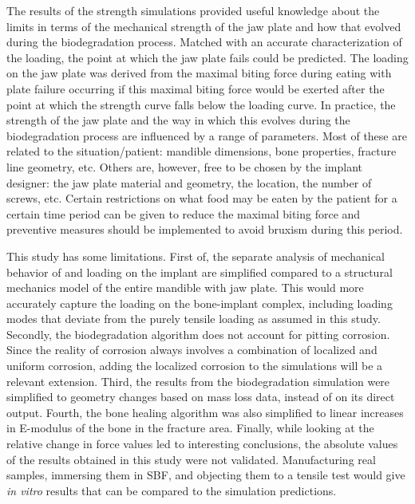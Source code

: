 The results of the strength simulations provided useful knowledge about the limits in terms of the mechanical strength of the jaw plate and how that evolved during the biodegradation process. Matched with an accurate characterization of the loading, the point at which the jaw plate fails could be predicted. The loading on the jaw plate was derived from the maximal biting force during eating with plate failure occurring if this maximal biting force would be exerted after the point at which the strength curve falls below the loading curve. In practice, the strength of the jaw plate and the way in which this evolves during the biodegradation process are influenced by a range of parameters. Most of these are related to the situation/patient: mandible dimensions, bone properties, fracture line geometry, etc. Others are, however, free to be chosen by the implant designer: the jaw plate material and geometry, the location, the number of screws, etc. Certain restrictions on what food may be eaten by the patient for a certain time period can be given to reduce the maximal biting force and preventive measures should be implemented to avoid bruxism during this period. 

This study has some limitations. First of, the separate analysis of mechanical behavior of and loading on the implant are simplified compared to a structural mechanics model of the entire mandible with jaw plate. This would more accurately capture the loading on the bone-implant complex, including loading modes that deviate from the purely tensile loading as assumed in this study. Secondly, the biodegradation algorithm does not account for pitting corrosion. Since the reality of corrosion always involves a combination of localized and uniform corrosion, adding the localized corrosion to the simulations will be a relevant extension. Third, the results from the biodegradation simulation were simplified to geometry changes based on mass loss data, instead of on its direct output. Fourth, the bone healing algorithm was also simplified to linear increases in E-modulus of the bone in the fracture area. Finally, while looking at the relative change in force values led to interesting conclusions, the absolute values of the results obtained in this study were not validated. Manufacturing real samples, immersing them in \gls{SBF}, and objecting them to a tensile test would give \textit{in vitro} results that can be compared to the simulation predictions.

